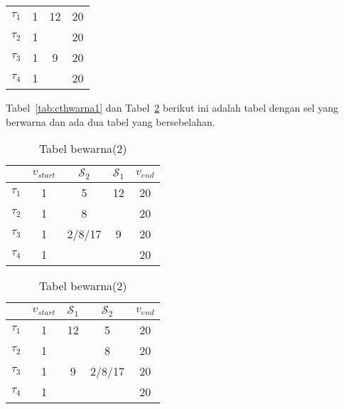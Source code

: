 \begin{enumerate}
\begin{table}[H]
\begin{tabular}{cccc}
		\midrule
		$\tau_{1}$ & 1 & 12& 20\\
		$\tau_{2}$ & 1 &  & 20\\
		$\tau_{3}$ & 1 & 9 & 20\\
		$\tau_{4}$ & 1 &  & 20\\

		\bottomrule
		
	\end{tabular} 
\end{table}
Tabel~\ref{tab:cthwarna1} dan Tabel~\ref{tab:cthwarna2} berikut ini adalah tabel dengan sel yang berwarna dan ada dua tabel yang bersebelahan. 
\begin{table}[H]
	\begin{minipage}[c]{0.49\linewidth}
		\centering
		\caption{Tabel bewarna(1)}
		\label{tab:cthwarna1}
		\begin{tabular}{ccccc}
			\toprule
			 & $v_{start}$ & $\mathcal{S}_{2}$ & $\mathcal{S}_{1}$ & $v_{end}$\\
			
			\midrule
			$\tau_{1}$ & 1 & 5 \cellcolor{green}& 12& 20\\
			$\tau_{2}$ & 1 & 8 \cellcolor{green}& & 20\\
			$\tau_{3}$ & 1 & 2/8/17 \cellcolor{green}& 9 & 20\\
			$\tau_{4}$ & 1 & \cellcolor{red}& & 20\\
			
			\bottomrule

		\end{tabular}
	\end{minipage}
	\begin{minipage}[c]{0.49\linewidth}
		
		\centering 
		\caption{Tabel bewarna(2)}
		\label{tab:cthwarna2}
		\begin{tabular}{ccccc}
			\toprule
			 & $v_{start}$ & $\mathcal{S}_{1}$ & $\mathcal{S}_{2}$ & $v_{end}$\\
			
			\midrule
			$\tau_{1}$ & 1 & 12& 5 \cellcolor{red} &20\\
			$\tau_{2}$ & 1 &  &  8 \cellcolor{green} &20\\
			$\tau_{3}$ & 1 & 9 & 2/8/17 \cellcolor{green} &20\\
			$\tau_{4}$ & 1 &   & \cellcolor{red} &20\\
			
			\bottomrule
		
		\end{tabular}
	\end{minipage}
\end{table}


\end{enumerate}
